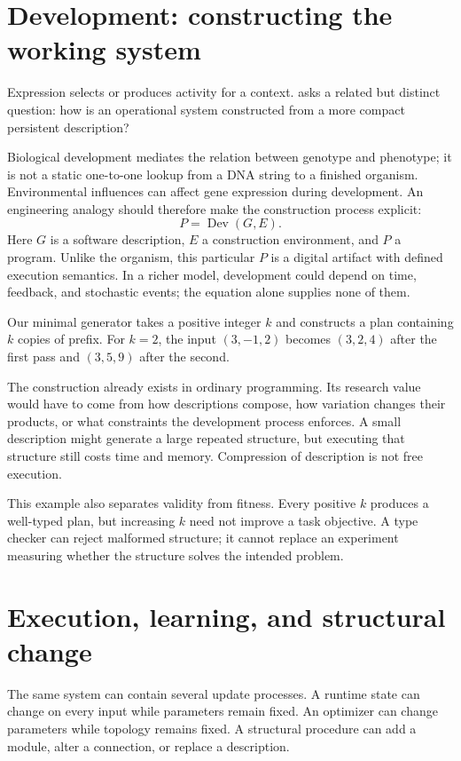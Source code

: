 \section{Development: constructing the working system}\label{sec:development}
Expression selects or produces activity for a context.  asks a related but distinct question: how is an operational system constructed from a more compact persistent description?

Biological development mediates the relation between genotype and phenotype; it is not a static one-to-one lookup from a DNA string to a finished organism.\cite{development} Environmental influences can affect gene expression during development.\cite{environment} An engineering analogy should therefore make the construction process explicit:
\[
 P=\operatorname{Dev}(G,E).
\]
Here $G$ is a software description, $E$ a construction environment, and $P$ a program. Unlike the organism, this particular $P$ is a digital artifact with defined execution semantics. In a richer model, development could depend on time, feedback, and stochastic events; the equation alone supplies none of them.

Our minimal generator takes a positive integer $k$ and constructs a plan containing $k$ copies of prefix. For $k=2$, the input $(3,-1,2)$ becomes $(3,2,4)$ after the first pass and $(3,5,9)$ after the second.

The construction already exists in ordinary programming. Its research value would have to come from how descriptions compose, how variation changes their products, or what constraints the development process enforces. A small description might generate a large repeated structure, but executing that structure still costs time and memory. Compression of description is not free execution.

This example also separates validity from fitness. Every positive $k$ produces a well-typed plan, but increasing $k$ need not improve a task objective. A type checker can reject malformed structure; it cannot replace an experiment measuring whether the structure solves the intended problem.

\section{Execution, learning, and structural change}\label{sec:timescales}
The same system can contain several update processes. A runtime state can change on every input while parameters remain fixed. An optimizer can change parameters while topology remains fixed. A structural procedure can add a module, alter a connection, or replace a description.

